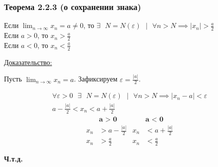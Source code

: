 \documentclass[12pt]{article}
\begin{document}
    \subsubsection*{Теорема 2.2.3 (о сохранении знака)}\label{th:2.2.3}
    \begin{adjustwidth}{1.5em}{1.5em}
        Если $\lim_{n\to\infty}x_n = a \ne 0$, то $\exists \text{ } N = N(\varepsilon) \text{ } \big| \text{ } \forall n > N \implies |x_n| > \frac{a}{2}$\\
        Если $a > 0$, то $x_n > \frac{a}{2}$\\
        Если $a < 0$, то $x_n < \frac{a}{2}$    
    \end{adjustwidth}
    \underline{Доказательство:} 
    \begin{adjustwidth}{1.5em}{1.5em}
        Пусть $\lim_{n\to\infty} x_n = a$. Зафиксируем $\varepsilon = \frac{|a|}{2}$.
    \end{adjustwidth}
    \begin{gather*}
        \forall \varepsilon > 0 \text{ } \exists \text{ } N = N(\varepsilon) \text{ } \big| \text{ } \forall n > N \implies |x_n - a| < \varepsilon\\
        a - \frac{|a|}{2} < x_n < a + \frac{|a|}{2}
    \end{gather*}
    \begin{align*}
        &\textbf{a > 0} & &\textbf{a < 0}\\
        x_n &> a - \frac{|a|}{2} & x_n &< a + \frac{|a|}{2}\\
        x_n &> \frac{a}{2} & x_n &< \frac{a}{2}
    \end{align*}
    \begin{center}
        \textbf{Ч.т.д.}
    \end{center}
\end{document}
